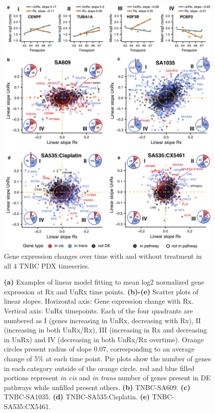 \begin{figure}
\centering
 \includegraphics[width=\textwidth]{Figures/chap5/fig15_GeneschanginginRxclouds.png}
\caption{Gene expression changes over time with and without treatment in all 4 TNBC PDX timeseries.}%
	\label{fig:GeneschanginginRxclouds}
\end{figure}
\begin{figure}[t]	
\contcaption
	{\small
\textbf{(a)} Examples of linear model fitting to mean log2 normalized gene expression at Rx and UnRx time points. \textbf{(b)-(e)} Scatter plots of linear slopes. Horizontal axis: Gene expression change with Rx. Vertical axis: UnRx timepoints. Each of the four quadrants are numbered as I (genes increasing in UnRx, decreasing with Rx), II (increasing in both UnRx/Rx), III (increasing in Rx and decreasing in UnRx) and  IV (decreasing in both UnRx/Rx overtime). Orange circles present radius of slope 0.07, corresponding to an average change of 5\% at each time point. Pie plots show the number of genes in each category outside of the orange circle. red and blue filled portions represent \textit{in cis} and \textit{in trans} number of genes present in DE pathways while unfilled present others. \textbf{(b)} TNBC-SA609. \textbf{(c)} TNBC-SA1035. %
\textbf{(d)} TNBC-SA535:Cisplatin. \textbf{(e)} TNBC-SA535:CX5461.}


\end{figure}



